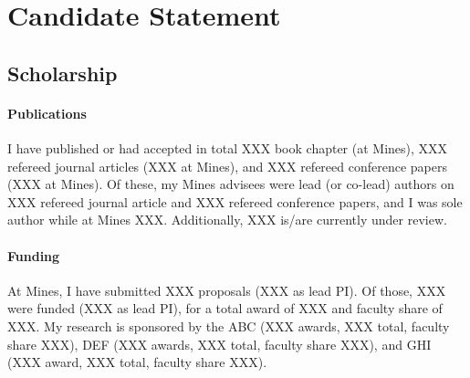\documentclass[letterpaper,12pt,times]{article}
\newcommand{\pdfscale}[0]{.7647}
\newcommand{\sectionname}[0]{}
\newcommand{\subsectionname}[0]{}
\renewcommand\thesubsection{\thesection\alph{subsection}.}
\renewcommand\thesection{\arabic{section}.}
\newif\ifinstr
\newcommand{\instr}[1]{
  \ifinstr
    \begin{leftbar}%
      \begin{color}{ColoradoRed}%
        \itshape
        \noindent%
        \ignorespaces%
        #1
      \end{color}
    \end{leftbar}%
  \else
  \fi
}
\begin{document}
% 
% 

\clearpage
\section{Candidate Statement}
\rhead{\thesubsection{} \sectionname, \subsectionname}

\instr{
  Provide a summary of important accomplishments (impacts and
  advances) related to scholarship, teaching, and service in such a
  way as to demonstrate a positive trajectory. Build upon facts,
  describe the unique strengths and circumstances of the
  application. Applications for promotion to Full Professor should
  provide specific examples of leadership and national/international
  recognition.

  A narrative length of between two and five pages is suggested.
}



\newsavebox\precite
\savebox\precite{\parbox{\textwidth}{}}

\subsection{Scholarship}

\paragraph{Publications}
I have published or had accepted in total XXX book chapter (at Mines),
XXX refereed journal articles (XXX at Mines), and XXX refereed
conference papers (XXX at Mines).  Of these, my Mines advisees were
lead (or co-lead) authors on XXX refereed journal article and XXX
refereed conference papers, and I was sole author while at Mines XXX.
Additionally, XXX is/are currently under review.


\paragraph{Funding}
At Mines, I have submitted XXX proposals (XXX as lead PI).
%
Of those, XXX were funded (XXX as lead PI), for a total award of
XXX and faculty share of XXX.
%
My research is sponsored by the ABC (XXX awards, XXX total, faculty
share XXX), DEF (XXX awards, XXX total, faculty share XXX),
and GHI (XXX award, XXX total, faculty share XXX).
\end{document}
